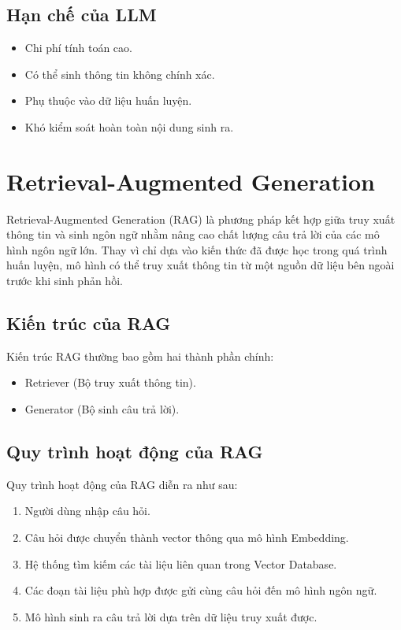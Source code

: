 \documentclass[12pt,a4paper]{report}
\begin{document}
	\subsection{Hạn chế của LLM}
	
	\begin{itemize}
		\item Chi phí tính toán cao.
		\item Có thể sinh thông tin không chính xác.
		\item Phụ thuộc vào dữ liệu huấn luyện.
		\item Khó kiểm soát hoàn toàn nội dung sinh ra.
	\end{itemize}
	\section{Retrieval-Augmented Generation}
	
	Retrieval-Augmented Generation (RAG) là phương pháp kết hợp giữa truy xuất thông tin và sinh ngôn ngữ nhằm nâng cao chất lượng câu trả lời của các mô hình ngôn ngữ lớn. Thay vì chỉ dựa vào kiến thức đã được học trong quá trình huấn luyện, mô hình có thể truy xuất thông tin từ một nguồn dữ liệu bên ngoài trước khi sinh phản hồi.
	
	\subsection{Kiến trúc của RAG}
	
	Kiến trúc RAG thường bao gồm hai thành phần chính:
	
	\begin{itemize}
		\item Retriever (Bộ truy xuất thông tin).
		\item Generator (Bộ sinh câu trả lời).
	\end{itemize}
	
	\subsection{Quy trình hoạt động của RAG}
	
	Quy trình hoạt động của RAG diễn ra như sau:
	
	\begin{enumerate}
		\item Người dùng nhập câu hỏi.
		\item Câu hỏi được chuyển thành vector thông qua mô hình Embedding.
		\item Hệ thống tìm kiếm các tài liệu liên quan trong Vector Database.
		\item Các đoạn tài liệu phù hợp được gửi cùng câu hỏi đến mô hình ngôn ngữ.
		\item Mô hình sinh ra câu trả lời dựa trên dữ liệu truy xuất được.
	\end{enumerate}
	
\end{document}
